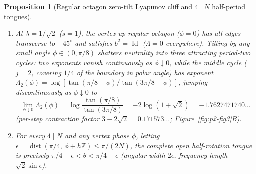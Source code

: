 \documentclass[11pt,reqno]{amsart}
\newtheorem{proposition}[theorem]{Proposition}
\theoremstyle{definition}
\theoremstyle{remark}
\newcommand{\Z}{\mathbb{Z}}
\DeclareMathOperator{\dist}{dist}
\DeclareMathOperator{\Id}{Id}
\begin{document}
\begin{proposition}[Regular octagon zero-tilt Lyapunov cliff and \texorpdfstring{$4\mid N$}{4|N} half-period tongues]\label{prop:octagon-cliff}
\leavevmode
\begin{enumerate}
  \item At $\lambda = 1/\sqrt{2}$ ($s = 1$), the vertex-up regular octagon ($\phi = 0$) has all edges transverse to $\pm 45^\circ$ and satisfies $b^2 = \Id$ ($\Lambda = 0$ everywhere). Tilting by any small angle $\phi \in (0, \pi/8)$ shatters neutrality into three attracting period-two cycles: two exponents vanish continuously as $\phi \downarrow 0$, while the middle cycle ($j = 2$, covering $1/4$ of the boundary in polar angle) has exponent $\Lambda_2(\phi) = \log[\tan(\pi/8 + \phi)/\tan(3\pi/8 - \phi)]$, jumping discontinuously as $\phi \downarrow 0$ to
  \[
    \lim_{\phi \downarrow 0} \Lambda_2(\phi) = \log\frac{\tan(\pi/8)}{\tan(3\pi/8)} = -2\log(1 + \sqrt{2}) = -1.7627471740\ldots
  \]
  (per-step contraction factor $3 - 2\sqrt{2} = 0.171573\ldots$; Figure~\ref{fig:p2-fig3}B).
  \item For every $4 \mid N$ and any vertex phase $\phi$, letting $\epsilon = \dist(\pi/4,\, \phi + h\Z) \le \pi/(2N)$, the complete open half-rotation tongue is precisely $\pi/4 - \epsilon < \theta < \pi/4 + \epsilon$ (angular width $2\epsilon$, frequency length $\sqrt{2}\sin\epsilon$).
\end{enumerate}
\end{proposition}
\end{document}
